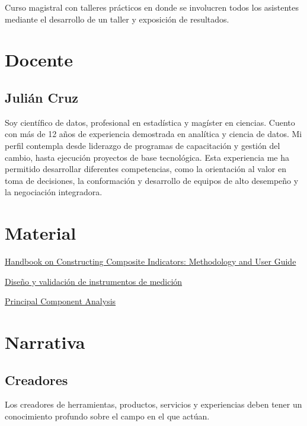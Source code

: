 \documentclass[
  letterpaper,
  DIV=11,
  numbers=noendperiod]{scrreprt}
\begin{document}
Curso magistral con talleres prácticos en donde se involucren todos los
asistentes mediante el desarrollo de un taller y exposición de
resultados.

\section{Docente}\label{docente}

\subsection{Julián Cruz}\label{juliuxe1n-cruz}

Soy científico de datos, profesional en estadística y magíster en
ciencias. Cuento con más de 12 años de experiencia demostrada en
analítica y ciencia de datos. Mi perfil contempla desde liderazgo de
programas de capacitación y gestión del cambio, hasta ejecución
proyectos de base tecnológica. Esta experiencia me ha permitido
desarrollar diferentes competencias, como la orientación al valor en
toma de decisiones, la conformación y desarrollo de equipos de alto
desempeño y la negociación integradora.

\section{Material}\label{material-1}

\href{https://www.istat.it/wp-content/uploads/2014/06/Handbook-on-Constructing-Composite-Indicators.pdf}{Handbook
on Constructing Composite Indicators: Methodology and User Guide}

\href{https://core.ac.uk/download/pdf/47265078.pdf}{Diseño y validación
de instrumentos de medición}

\href{http://cda.psych.uiuc.edu/statistical_learning_course/Jolliffe\%20I.\%20Principal\%20Component\%20Analysis\%20(2ed.,\%20Springer,\%202002)(518s)_MVsa_.pdf}{Principal
Component Analysis}

\section{Narrativa}\label{narrativa}

\subsection{Creadores}\label{creadores}

Los creadores de herramientas, productos, servicios y experiencias deben
tener un conocimiento profundo sobre el campo en el que actúan.
\end{document}
